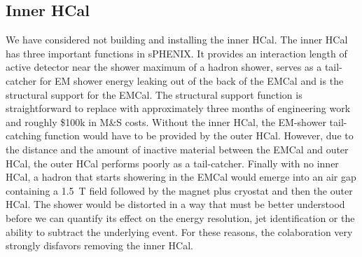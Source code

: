 \subsection{Inner HCal}
\label{ihcal}

We have considered not building and installing the inner HCal.  The
inner HCal has three important functions in sPHENIX.  It provides an
interaction length of active detector near the shower maximum of a
hadron shower, serves as a tail-catcher for EM shower energy leaking
out of the back of the EMCal and is the structural support for the
EMCal.  The structural support function is straightforward to replace
with approximately three months of engineering work and roughly \$100k
in M\&S costs.  Without the inner HCal, the EM-shower tail-catching
function would have to be provided by the outer HCal.  However, due to
the distance and the amount of inactive material between the EMCal and
outer HCal, the outer HCal performs poorly as a tail-catcher.  Finally
with no inner HCal, a hadron that starts showering in the EMCal would
emerge into an air gap containing a 1.5~T field followed by the magnet
plus cryostat and then the outer HCal.  The shower would be distorted
in a way that must be better understood before we can quantify its
effect on the energy resolution, jet identification or the ability to
subtract the underlying event.  For these reasons, the colaboration
very strongly disfavors removing the inner HCal.

